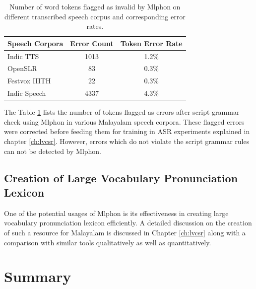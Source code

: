 

\begin{table}[htpb]
	\caption{Number of word tokens flagged as invalid by Mlphon on different transcribed speech corpus and corresponding error rates.}
	\label{tab:sanitycheck}
	\centering
	\begin{tabular}{lcc}
		\hline \hline
		Speech Corpora                                       & Error Count & Token Error Rate \\
		\hline
		Indic TTS \cite{baby2016resources}                   & 1013        & 1.2\%            \\
		OpenSLR \cite{he-etal-2020-open}                     & 83          & 0.3\%            \\
		Festvox IIITH \cite{prahallad2012iiit}               & 22          & 0.3\%            \\
		Indic Speech \cite{srivastava-etal-2020-indicspeech} & 4337        & 4.3\%            \\
		\hline
	\end{tabular}
\end{table}

The Table \ref{tab:sanitycheck} lists the number of tokens flagged as errors after
script grammar check using Mlphon in various Malayalam speech corpora. These
flagged errors were corrected before feeding them for training in ASR
experiments explained in chapter \ref{ch:lvcsr}. However, errors which do not
violate the script grammar rules can not be detected by Mlphon.


\subsection{Creation of Large Vocabulary Pronunciation Lexicon}

One of the  potential usages of Mlphon is its effectiveness in creating large vocabulary pronunciation lexicon efficiently. A detailed discussion on the creation of such a resource for Malayalam is discussed in Chapter \ref{ch:lvcsr} along with a comparison with similar tools qualitatively as well as quantitatively.

\section{Summary}


